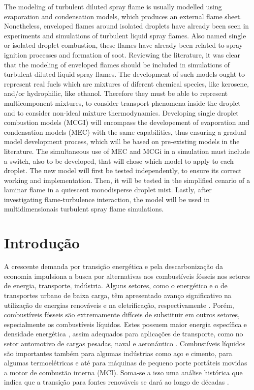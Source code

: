 {

\noindent
The modeling of turbulent diluted spray flame is usually modelled using evaporation and condensation models, which produces an external flame sheet.
Nonetheless, enveloped flames around isolated droplets have already been seen in experiments and simulations of turbulent liquid spray flames.
Also named single or isolated droplet combustion, these flames have already been related to spray ignition processes and formation of soot.
Reviewing the literature, it was clear that the modeling of enveloped flames should be included in simulations of turbulent diluted liquid spray flames. 
The development of such models ought to represent real fuels which are mixtures of diferent chemical species, like kerosene, and/or hydrophilic, like ethanol.  
Therefore they must be able to represent multicomponent mixtures, to consider transport phenomena inside the droplet and to consider non-ideal mixture thermodynamics.
Developing single droplet combustion models (MCGI) will encompass the developement of evaporation and condensation models (MEC) with the same capabilities, thus ensuring a gradual model development process, which will be based on pre-existing models in the literature.
The simultaneous use of MEC and MCGi in a simulation must include a switch, also to be developed, that will chose which model to apply to each droplet.
The new model will first be tested independently, to ensure its correct working and implementation.
Then, it will be tested in the simplified cenario of a laminar flame in a quiescent monodisperse droplet mist.
Lastly, after investigating flame-turbulence interaction, the model will be used in multidimensionais turbulent spray flame simulations.

}\section{Introdução} \label{sec:intro}

A crescente demanda por transição energética e pela descarbonização da economia impulsiona a busca por alternativas aos combustíveis fósseis nos setores de energia, transporte, indústria. 
Alguns setores, como o energético e o de transportes urbano de baixa carga, têm apresentado avanço significativo na utilização de energias renováveis e na eletrificação, respectivamente \cite{MasriA2021}. 
Porém, combustíveis fósseis são extremamente difíceis de substituir em outros setores, especialmente os combustíveis líquidos.
Estes possuem maior energia específica e densidade energética \cite{Bergthorson2017,Julien2017}, assim adequados para aplicações de transporte, como no setor automotivo de cargas pesadas, naval e aeronáutico \cite{MasriA2021}.
Combustíveis líquidos são importantes também para algumas indústrias como aço e cimento, para algumas termoelétricas e até para máquinas de pequeno porte portáteis movidas a motor de combustão interna (MCI).
Soma-se a isso uma análise histórica que indica que a transição para fontes renováveis se dará ao longo de décadas \cite{MasriA2021}.

